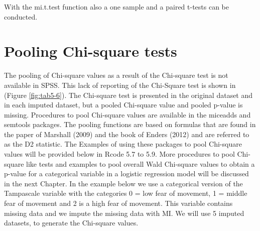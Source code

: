 \documentclass[]{book}
\theoremstyle{definition}
\theoremstyle{definition}
\theoremstyle{definition}
\theoremstyle{remark}
\begin{document}
With the mi.t.test function also a one sample and a paired t-tests can
be conducted.

\section{Pooling Chi-square tests}\label{pooling-chi-square-tests}

The pooling of Chi-square values as a result of the Chi-square test is
not available in SPSS. This lack of reporting of the Chi-Square test is
shown in (Figure \ref{fig:tab5-6}). The Chi-square test is presented in
the original dataset and in each imputed dataset, but a pooled
Chi-square value and pooled p-value is missing. Procedures to pool
Chi-square values are available in the miceadds and semtools packages.
The pooling functions are based on formulas that are found in the paper
of Marshall (2009) and the book of Enders (2012) and are referred to as
the D2 statistic. The Examples of using these packages to pool
Chi-square values will be provided below in Rcode 5.7 to 5.9. More
procedures to pool Chi-square like tests and examples to pool overall
Wald Chi-square values to obtain a p-value for a categorical variable in
a logistic regression model will be discussed in the next Chapter. In
the example below we use a categorical version of the Tampascale
variable with the categories 0 = low fear of movement, 1 = middle fear
of movement and 2 is a high fear of movement. This variable contains
missing data and we impute the missing data with MI. We will use 5
imputed datasets, to generate the Chi-square values.
\end{document}

